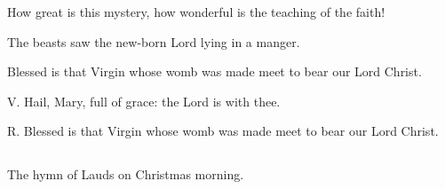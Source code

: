 \noindent{}\par
\noindent{}\par
\medskip

\noindent How great is this mystery, how wonderful is the teaching of the faith!\par
\noindent The beasts saw the new-born Lord lying in a manger.\par
\noindent Blessed is that Virgin whose womb was made meet to bear our Lord Christ.\par
\noindent V. Hail, Mary, full of grace: the Lord is with thee.\par
\noindent R. Blessed is that Virgin whose womb was made meet to bear our Lord Christ.\par

\subsection{}

The hymn of Lauds on Christmas morning.

